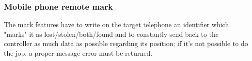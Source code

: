 \subsubsection{Mobile phone remote mark}
\small{The mark features have to write on the target telephone an identifier which "marks" it as lost/stolen/both/found and to constantly send back to the controller as much data as possible regarding its position; if it's not possible to do the job, a proper message error must be returned.}